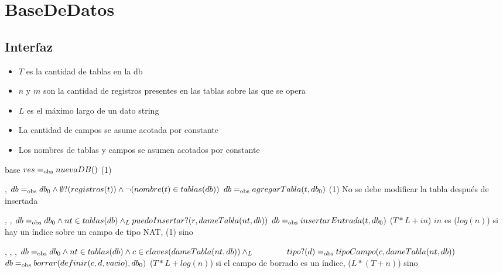 \section{BaseDeDatos}

\subsection{Interfaz}

\iusa{}

\ioperaciones

\begin{itemize}
    \item{$T$ es la cantidad de tablas en la db}
    \item{$n$ y $m$ son la cantidad de registros presentes en las tablas sobre las que se opera}
    \item{$L$ es el máximo largo de un dato string}
    \item{La cantidad de campos se asume acotada por constante}
    \item{Los nombres de tablas y campos se asumen acotados por constante}
\end{itemize}

{} %
{base} %
{} %
{$res =_{\mathrm{obs}} nuevaDB()$} %
{\bigo(1)} %
{} %
{} %

{   ,
    }
{}
{$db =_{\mathrm{obs}} db_0 \land \emptyset?(registros(t)) \land \neg(nombre(t) \in tablas(db))$}
{$db =_{\mathrm{obs}} agregarTabla(t,db_0)$}
{\bigo(1)}
{No se debe modificar la tabla después de insertada}
{}

{   ,
    ,
    }
{}
{$db =_{\mathrm{obs}} db_0 \land nt \in tablas(db) \land_L puedoInsertar?(r,dameTabla(nt,db))$}
{$db =_{\mathrm{obs}} insertarEntrada(t,db_0)$}
{\bigo($T * L + in$)}
{}
{$in$ es \bigo($log(n)$) si hay un índice sobre un campo de tipo NAT, \bigo(1) sino}

{   ,
    ,
    ,
    }
{}
{$db =_{\mathrm{obs}} db_0 \land nt \in tablas(db) \land c \in claves(dameTabla(nt,db)) \land_L \\
    \hspace*{4em} tipo?(d) =_{\mathrm{obs}} tipoCampo(c,dameTabla(nt,db))$}
{$db =_{\mathrm{obs}} borrar(definir(c,d,vacio),db_0)$}
{\bigo($T * L + log(n)$) si el campo de borrado es un índice, \bigo($L * (T + n)$) sino}
{}
{}

